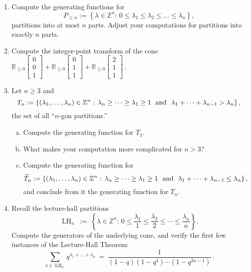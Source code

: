 \documentclass[11pt]{article}
\def\RR{\mathbb{R}}
\def\ZZ{\mathbb{Z}}
\DeclareMathOperator{\LH}{LH}
\begin{document}
\begin{enumerate}[(1)]
\vspace{-10pt}

\item Compute the generating functions for
\[
  P_{ \le n } := \left\{ \lambda \in \ZZ^n : \, 0 \le \lambda_1 \le \lambda_2 \le
\dots \le \lambda_n \right\} ,
\]
partitions into at most $n$ parts.
Adjust your computations for partitions into exactly $n$ parts.

\item Compute the integer-point transform of the cone
$
  \RR_{ \ge 0 } \begin{bmatrix} 0 \\ 0 \\ 1 \end{bmatrix} + 
  \RR_{ \ge 0 } \begin{bmatrix} 0 \\ 1 \\ 1 \end{bmatrix} + 
  \RR_{ \ge 0 } \begin{bmatrix} 2 \\ 1 \\ 1 \end{bmatrix} \, .
$

\def\la{\lambda}

\item Let $n \ge 3$ and
\[
  T_n := \left\{ (\la_1, \dots , \la_n) \in \ZZ^n : \, \la_n \ge \cdots \ge \la_1 \ge 1 \ \text{ \rm and } \ \la_1 + \cdots + \la_{n-1} > \la_n \right\} ,
\]
the set of all ``$n$-gon partitions.''
\begin{enumerate}[(a)]
\item Compute the generating function for $T_3$.
\item What makes your computation more complicated for $n > 3$?
\item Compute the generating function for
\[
  \widetilde T_n := \left\{ (\la_1, \dots , \la_n) \in \ZZ^n : \, \la_n \ge \cdots
\ge \la_1 \ge 1 \ \text{ \rm and } \ \la_1 + \cdots + \la_{n-1} \le \la_n \right\} ,
\]
and conclude from it the generating function for $T_n$.
\end{enumerate}

\item 
Recall the lecture-hall partitions
\[
\LH_n \ := \ \left \{\lambda\in\ZZ^n:\, 0 \leq \frac{\lambda_{1}}{{1}}\leq
\frac{\lambda_{2}}{{2}} \leq \cdots\leq \frac{\lambda_{n}}{{n}}\right \} .
\]
Compute the generators of the underlying cone, and verify the first few instances of
the 
Lecture-Hall Theorem:
\[ \sum_{ \lambda \in \LH_n } q^{ \lambda_1 + \dots + \lambda_n } \ =
\ \frac{ 1 }{ (1-q) (1-q^3) \cdots (1-q^{ 2n-1 }) } \, . \] 


\end{enumerate}
\end{document}
